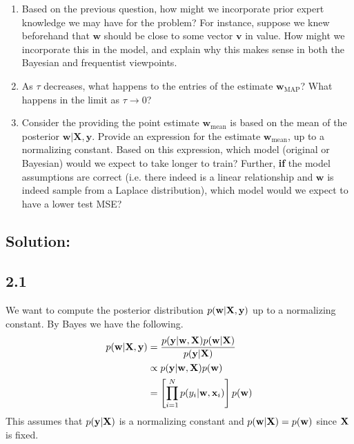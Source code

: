 \documentclass[submit]{harvardml}
\begin{document}
\begin{problem}
\begin{enumerate}
        \item Based on the previous question, how might we incorporate prior expert knowledge we may have for the problem? For instance, suppose we knew beforehand that $\mathbf{w}$ should be close to some vector $\mathbf{v}$ in value. How might we incorporate this in the model, and explain why this makes sense in both the Bayesian and frequentist viewpoints.
        
        \item As $\tau$ decreases, what happens to the entries of the estimate $\mathbf{w}_{\mathrm{MAP}}$? What happens in the limit as $\tau \to 0$?
        
        \item Consider the providing the point estimate $\mathbf{w}_{\mathrm{mean}}$ is based on the mean of the posterior $\mathbf{w}|\mathbf{X},\mathbf{y}$. Provide an expression for the estimate $\mathbf{w}_{\mathrm{mean}}$, up to a normalizing constant. Based on this expression, which model (original or Bayesian) would we expect to take longer to train? Further, \textbf{if} the model assumptions are correct (i.e. there indeed is a linear relationship and $\mathbf{w}$ is indeed sample from a Laplace distribution), which model would we expect to have a lower test MSE?
        
    \end{enumerate}
  
  
\end{problem}

\subsection*{Solution:}

\subsection*{2.1}
We want to compute the posterior distribution $p(\vb{w}|\vb{X}, \vb{y})$ up to a normalizing constant. By Bayes we have the following.
\begin{align*}
    p(\vb{w} | \vb{X}, \vb{y}) &= \frac{p(\vb{y} | \vb{w}, \vb{X}) p(\vb{w} | \vb{X})}{p(\vb{y} | \vb{X})} \\
    &\propto p(\vb{y} | \vb{w}, \vb{X}) p(\vb{w}) \\
    &= \left[ \prod_{i=1}^N p(y_i | \vb{w}, \vb{x}_i) \right] p(\vb{w})
\end{align*}
This assumes that $p(\vb{y}|\vb{X})$ is a normalizing constant and $p(\vb{w}|\vb{X}) = p(\vb{w})$ since $\vb{X}$ is fixed.
\end{document}
